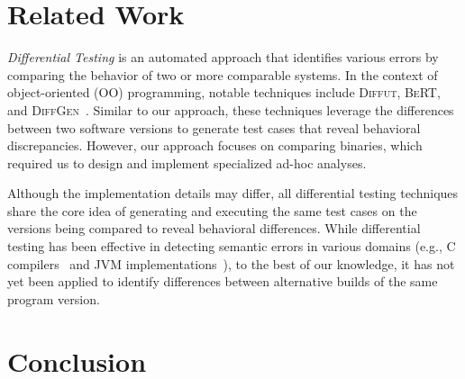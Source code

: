 \documentclass[conference]{IEEEtran}
\begin{document}
\section{Related Work}

\emph{Differential Testing}\cite{difftesting} is an automated approach that identifies various errors by comparing the behavior of two or more comparable systems\cite{xie2007towards,jin10
,diffgen}. In the context of object-oriented (OO) programming, notable techniques include \textsc{Diffut}\cite{xie2007towards}, \textsc{BeRT}\cite{jin10
}, and \textsc{DiffGen}~\cite{diffgen}. Similar to our approach, these techniques leverage the differences between two software versions to generate test cases that reveal behavioral discrepancies. However, our approach focuses on comparing binaries, which required us to design and implement specialized ad-hoc analyses.

Although the implementation details may differ, all differential testing techniques share the core idea of generating and executing the same test cases on the versions being compared to reveal behavioral differences. %
While differential testing has been effective in detecting semantic errors in various domains (e.g., C compilers~\cite{Yang:compiler:pldi:2011} and JVM implementations~\cite{Chen:jvmdiff:pldi:2016}), to the best of our knowledge, it has not yet been applied to identify differences between alternative builds of the same program version.






\section{Conclusion}











\end{document}
